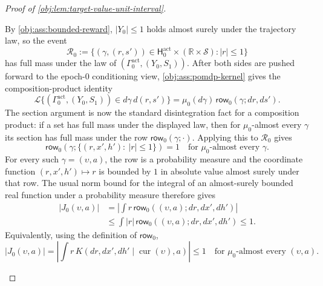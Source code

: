 \begin{proof}[Proof of \cref{obj:lem:target-value-unit-interval}]
\begin{enumerate}
By \cref{obj:ass:bounded-reward}, \(|Y_0|\le1\) holds almost surely under the trajectory law, so the event
\[
\mathcal R_0
:=
\{(\gamma,(r,s'))\in\mathsf H^{\mathrm{act}}_0\times(\mathbb R\times\mathcal S): |r|\le1\}
\]
has full mass under the law of \((\Gamma^{\mathrm{act}}_0,(Y_0,S_1))\). After both sides are pushed forward to the epoch-\(0\) conditioning view, \cref{obj:ass:pomdp-kernel} gives the composition-product identity
\[
\mathcal L\{(\Gamma^{\mathrm{act}}_0,(Y_0,S_1))\in d\gamma\,d(r,s')\}
=
\mu_0(d\gamma)\,\mathsf{row}_0(\gamma;d r,d s').
\]
The section argument is now the standard disintegration fact for a composition product: if a set has full mass under the displayed law, then for \(\mu_0\)-almost every \(\gamma\) its section has full mass under the row \(\mathsf{row}_0(\gamma;\cdot)\). Applying this to \(\mathcal R_0\) gives
\[
\mathsf{row}_0\!\left(\gamma;\{(r,x',h'):\ |r|\le1\}\right)=1
\quad\text{for }\mu_0\text{-almost every }\gamma.
\]
For every such \(\gamma=(\upsilon,a)\), the row is a probability measure and the coordinate function \((r,x',h')\mapsto r\) is bounded by \(1\) in absolute value almost surely under that row. The usual norm bound for the integral of an almost-surely bounded real function under a probability measure therefore gives
\[
\begin{aligned}
|J_0(\upsilon,a)|
&=
\left|
\int r\,\mathsf{row}_0((\upsilon,a);d r,d x',d h')
\right| \\
&\le
\int |r|\,\mathsf{row}_0((\upsilon,a);d r,d x',d h')
\le 1 .
\end{aligned}
\]
Equivalently, using the definition of \(\mathsf{row}_0\),
\[
|J_0(\upsilon,a)|
=
\left|
\int r\,K(d r,d x',d h'\mid \operatorname{cur}(\upsilon),a)
\right|
\le1
\quad\text{for }\mu_0\text{-almost every }(\upsilon,a).
\]


\end{enumerate}
\end{proof}
